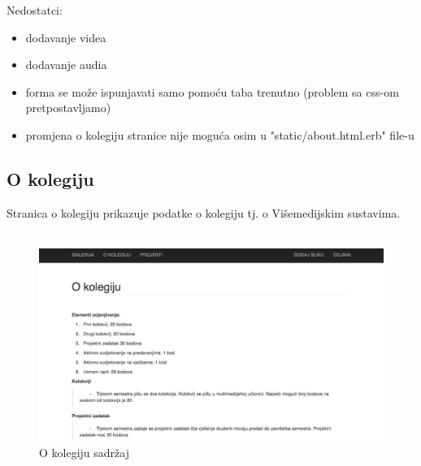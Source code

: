 \documentclass[]{article}
\begin{document}
\newpage

Nedostatci:
\begin{itemize}
	\item dodavanje videa
	\item dodavanje audia
	\item forma se može ispunjavati samo pomoću taba trenutno (problem sa css-om pretpostavljamo)
	\item promjena o kolegiju stranice nije moguća osim u "static/about.html.erb" file-u
\end{itemize}

\subsection{O kolegiju}
Stranica o kolegiju prikazuje podatke o kolegiju tj. o Višemedijskim sustavima.
\\
\\
\begin{figure}[h]
	\centering
	\includegraphics[scale=0.22]{o-kolegiju}
	\caption{O kolegiju sadržaj}
	\label{fig:mesh1}
\end{figure}
\end{document}
